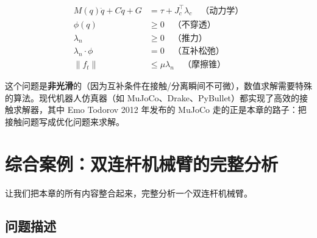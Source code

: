 \begin{keyformula}[title=接触动力学的数学形式]
\begin{align}
M(q)\ddot{q} + C\dot{q} + G &= \tau + J_c^\top \lambda_c \quad \text{（动力学）} \\
\phi(q) &\geq 0 \quad \text{（不穿透）} \\
\lambda_n &\geq 0 \quad \text{（推力）} \\
\lambda_n \cdot \phi &= 0 \quad \text{（互补松弛）} \\
\|f_t\| &\leq \mu \lambda_n \quad \text{（摩擦锥）}
\end{align}
\end{keyformula}

这个问题是\textbf{非光滑}的（因为互补条件在接触/分离瞬间不可微），数值求解需要特殊的算法。现代机器人仿真器（如 MuJoCo、Drake、PyBullet）都实现了高效的接触求解器，其中 Emo Todorov 2012 年发布的 MuJoCo 走的正是本章的路子：把接触问题写成优化问题来求解。

\section{综合案例：双连杆机械臂的完整分析}

让我们把本章的所有内容整合起来，完整分析一个双连杆机械臂。

\subsection{问题描述}

